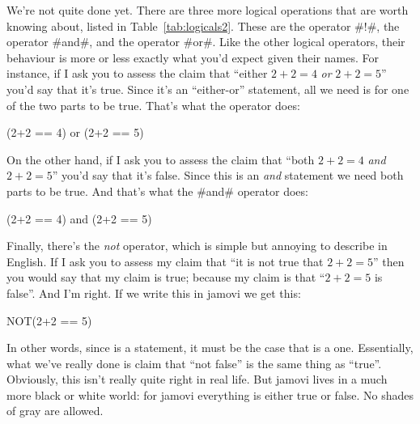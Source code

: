 We're not quite done yet. There are three more logical operations that are worth knowing about, listed in Table~\ref{tab:logicals2}. These are the  operator \rtextverb#!#, the  operator \rtextverb#and#, and the  operator \rtextverb#or#. Like the other logical operators, their behaviour is more or less exactly what you'd expect given their names. For instance, if I ask you to assess the claim that ``either $2+2 = 4$ {\it or} $2+2 = 5$'' you'd say that it's true. Since it's an ``either-or'' statement, all we need is for one of the two parts to be true. That's what the  operator does:

\begin{rblock1}
(2+2 == 4) or (2+2 == 5) 
\end{rblock1}

On the other hand, if I ask you to assess the claim that ``both $2+2 = 4$ {\it and} $2+2 = 5$'' you'd say that it's false. Since this is an {\it and} statement we need both parts to be true. And that's what the \rtextverb#and# operator does:

\begin{rblock1}
(2+2 == 4) and (2+2 == 5)
\end{rblock1}

Finally, there's the {\it not} operator, which is simple but annoying to describe in English. If I ask you to assess my claim that ``it is not true that $2+2 = 5$'' then you would say that my claim is true; because my claim is that ``$2+2 = 5$ is false''. And I'm right. If we write this in jamovi we get this: 

\begin{rblock1}
NOT(2+2 == 5)
\end{rblock1}

In other words, since  is a  statement, it must be the case that  is a  one. Essentially, what we've really done is claim that ``not false'' is the same thing as ``true''. Obviously, this isn't really quite right in real life. But jamovi lives in a much more black or white world: for jamovi everything is either true or false. No shades of gray are allowed. 


